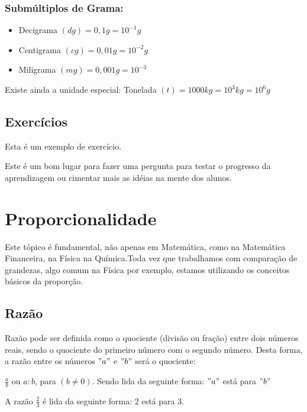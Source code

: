 \documentclass[11pt,fleqn]{book} %
\begin{document}
\subsection{Submúltiplos de Grama:}
\begin{itemize}
    \item Decigrama $(dg) = 0,1 g = 10^{-1} g$
    \item Centigrama $(cg) = 0,01 g = 10^{-2} g$
    \item Miligrama $(mg) = 0,001 g = 10^{-3}$
\end{itemize}
Existe ainda a unidade especial:
Tonelada $(t) = 1000 kg = 10^3 kg = 10^6 g$

\section{Exercícios}

Esta é um exemplo de exercício.
\begin{exercise}
Este é um bom lugar para fazer uma pergunta para testar o progresso da aprendizagem ou cimentar mais as idéias na mente dos alunos.
\end{exercise}


\chapter{Proporcionalidade}
Este tópico é fundamental, não apenas em Matemática, como na Matemática Financeira, na Física  na Química.Toda vez que trabalhamos com comparação de grandezas, algo comum na Física por exemplo, estamos utilizando os conceitos básicos da proporção.   

\section{Razão}
Razão pode ser definida como o quociente (divisão ou fração) entre dois números reais, sendo o quociente do primeiro número com o segundo número. Desta forma, a razão entre os números $"a"$ e $"b"$ será o quociente:

\begin{center}
	$\frac{a}{b}$ ou $a:b$, para $(b \neq 0)$. 	Sendo lida da seguinte forma: 
	$"a"$ está para $"b"$
\end{center}

\begin{example}
A razão $\frac{2}{3}$ é lida da seguinte forma: 2 está para 3.
\end{example}
\end{document}
